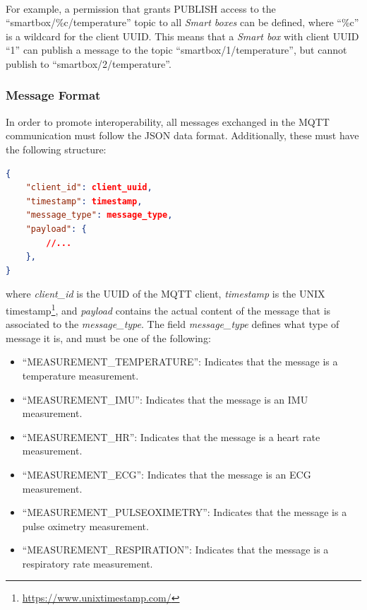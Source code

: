 
\paragraph{} For example, a permission that grants PUBLISH access to the ``smartbox/\%c/temperature'' topic to all \textit{Smart boxes} can be defined, where ``\%c'' is a wildcard for the client \acs{UUID}. This means that a \textit{Smart box} with client \acs{UUID} ``1'' can publish a message to the topic ``smartbox/1/temperature'', but cannot publish to ``smartbox/2/temperature''.

\subsubsection{Message Format}
\label{sec:mqtt payload format}
In order to promote interoperability, all messages exchanged in the \acs{MQTT} communication must follow the \acs{JSON} data format. Additionally, these must have the following structure:

\begin{lstlisting}[language=json]
{
    "client_id": client_uuid, 
    "timestamp": timestamp,
    "message_type": message_type,
    "payload": {
        //...
    }, 
}  
\end{lstlisting}

where \textit{client\_id} is the \acs{UUID} of the \acs{MQTT} client, \textit{timestamp} is the UNIX timestamp\footnote{\url{https://www.unixtimestamp.com/}}, and \textit{payload} contains the actual content of the message that is associated to the \textit{message\_type}. The field \textit{message\_type} defines what type of message it is, and must be one of the following:

\begin{itemize}
    \item ``MEASUREMENT\_TEMPERATURE'': Indicates that the message is a temperature measurement.
    \item ``MEASUREMENT\_IMU'': Indicates that the message is an \acs{IMU} measurement.
    \item ``MEASUREMENT\_HR'': Indicates that the message is a heart rate measurement.
    \item ``MEASUREMENT\_ECG'': Indicates that the message is an \acs{ECG} measurement.
    \item ``MEASUREMENT\_PULSEOXIMETRY'': Indicates that the message is a pulse oximetry measurement.
    \item ``MEASUREMENT\_RESPIRATION'': Indicates that the message is a respiratory rate measurement.
\end{itemize}

